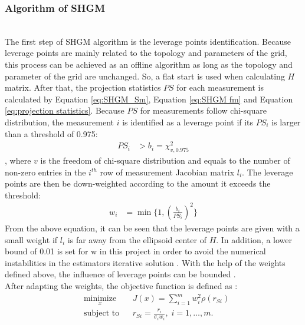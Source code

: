\subsubsection{Algorithm of SHGM}
\\The first step of SHGM algorithm is the leverage points identification. Because leverage points are mainly related to the topology and parameters of the grid, this process can be achieved as an offline algorithm as long as the topology and parameter of the grid are unchanged. So, a flat start is used when calculating $H$ matrix. After that, the projection statistics $PS$ for each measurement is calculated by Equation \ref{eq:SHGM_Sm}, Equation \ref{eq:SHGM fm} and Equation \ref{eq:projection statistics}. Because $PS$ for measurements follow
chi-square distribution, the measurement $i$ is identified as a leverage point if its $PS_i$ is larger than a threshold of 0.975:
\begin{align}
    PS_i &> b_i = \chi_{v,0.975}^{2}
    \label{eq:PS threshold}
\end{align}
, where $v$ is the freedom of chi-square distribution and equals to the number of non-zero entries in the $i^{th}$ row of measurement Jacobian matrix $l_i$. The leverage points are then be down-weighted according to the amount it exceeds the threshold:
\begin{align}
    w_i &= {\min} \{1, (\frac{b_i}{PS_i})^2\}
    \label{eq:weight of SHGM}
\end{align}
From the above equation, it can be seen that the leverage points are given with a small weight if $l_i$ is far away from the ellipsoid center of $H$. In addition, a lower bound of 0.01 is set for w in this project in order to avoid the numerical instabilities in the estimators iterative solution \cite{rousseeuw1993alternatives}. With the help of the weights defined above, the influence of leverage points can be bounded \cite{mili1996robust}. 
\bigskip
\\After adapting the weights, the objective function is defined as \cite{mili1996robust}:
\begin{equation}
    \begin{aligned}
    & \underset{x}{\text{minimize}}
    & & J(x)=\sum _{i=1}^{m} w_i^2 \rho (r_{Si}) \\
    & \text{subject to}
    & & r_{Si} = \frac{r_i}{\sigma_i w_i}, \; i = 1, \ldots, m.\\
    \label{eq:obj_fun_SHGM}
    \end{aligned}
\end{equation}
